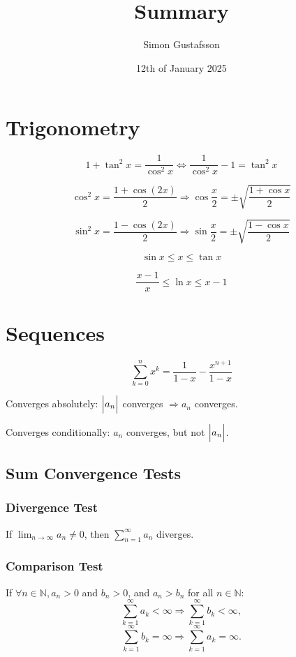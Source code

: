 \documentclass{article}
\title{Summary}
\author{Simon Gustafsson}
\date{12th of January 2025}
\begin{document}
\maketitle

\section{Trigonometry}

\[
1+\tan^{2}x = \frac{1}{\cos^{2}x} \Longleftrightarrow \frac{1}{\cos^{2}x} - 1 = \tan^{2}x
\]

\[
\cos^{2}x = \frac{1+\cos(2x)}{2} \Longrightarrow \cos\frac{x}{2} = \pm \sqrt{\frac{1+\cos x}{2}}
\]

\[
\sin^{2}x = \frac{1-\cos(2x)}{2} \Longrightarrow \sin\frac{x}{2} = \pm \sqrt{\frac{1-\cos x}{2}}
\]

\[
\sin x \leqslant x \leqslant \tan x
\]

\[
\frac{x-1}{x} \leqslant \ln x \leqslant x-1
\]

\section{Sequences}

\[
\sum_{k=0}^{n} x^{k} = \frac{1}{1-x} - \frac{x^{n+1}}{1-x}
\]

Converges absolutely: $\Bigl|a_{n}\Bigl|$ converges $\Longrightarrow a_{n}$ converges.

Converges conditionally: $a_{n}$ converges, but not $\Bigl|a_{n}\Bigl|$.

\subsection{Sum Convergence Tests}

\subsubsection{Divergence Test}

If $\lim_{n\rightarrow\infty} a_{n} \neq 0$, then $\sum_{n=1}^{\infty} a_{n}$ diverges.

\subsubsection{Comparison Test}

If $\forall n \in \mathbb{N}, a_{n} > 0$ and $b_{n} > 0$, and $a_{n} > b_{n}$ for all $n \in \mathbb{N}$:
\[
\sum_{k=1}^{\infty} a_{k} < \infty \Longrightarrow \sum_{k=1}^{\infty} b_{k} < \infty,
\]
\[
\sum_{k=1}^{\infty} b_{k} = \infty \Longrightarrow \sum_{k=1}^{\infty} a_{k} = \infty.
\]
\end{document}
